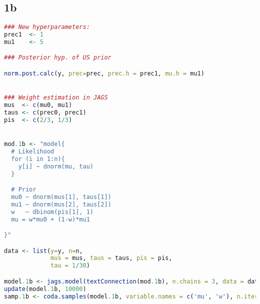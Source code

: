 \documentclass{article}
\begin{document}
\subsection{1b} \label{appA1b}
\begin{lstlisting}[language=R]
### New hyperparameters:
prec1  <- 1
mu1    <- 5

### Posterior hyp. of US prior

norm.post.calc(y, prec=prec, prec.h = prec1, mu.h = mu1)


### Weight estimation in JAGS
mus  <- c(mu0, mu1)
taus <- c(prec0, prec1)
pis  <- c(2/3, 1/3)


mod.1b <- "model{
  # Likelihood
  for (i in 1:n){
    y[i] ~ dnorm(mu, tau)
  }

  # Prior
  mu0 ~ dnorm(mus[1], taus[1])
  mu1 ~ dnorm(mus[2], taus[2])
  w   ~ dbinom(pis[1], 1)
  mu = w*mu0 + (1-w)*mu1

}"

data <- list(y=y, n=n, 
             mus = mus, taus = taus, pis = pis, 
             tau = 1/30)

model.1b <- jags.model(textConnection(mod.1b), n.chains = 3, data = data)
update(model.1b, 10000)
samp.1b <- coda.samples(model.1b, variable.names = c('mu', 'w'), n.iter = 20000)
\end{lstlisting}
\end{document}
